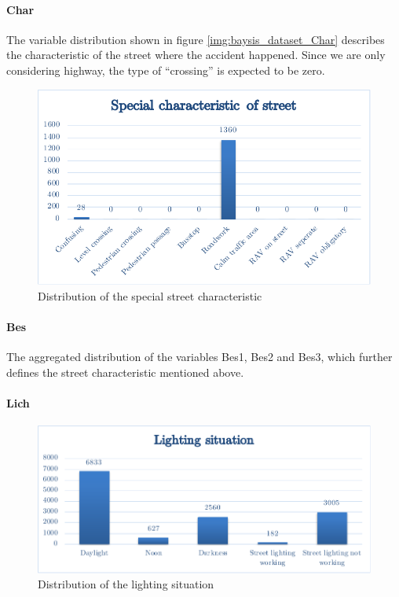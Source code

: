\documentclass[a4paper,12pt]{report}
\begin{document}
\paragraph{Char}
The variable distribution shown in figure \ref{img:baysis_dataset_Char} describes the characteristic of the street where the accident happened. Since we are only considering highway, the type of “crossing” is expected to be zero. 

\begin{figure}[h]
	\centering
	\includegraphics[scale=0.6]{./assets/baysis_dataset_Bes.pdf}
	\caption{Distribution of the special street characteristic}
	\label{img:baysis_dataset_Bes}
\end{figure}

\paragraph{Bes}
The aggregated distribution of the variables Bes1, Bes2 and Bes3, which further defines the street characteristic mentioned above. 

\paragraph{Lich}
\begin{figure}[h]
	\centering
	\includegraphics[scale=0.6]{./assets/baysis_dataset_Lich.pdf}
	\caption{Distribution of the lighting situation}
	\label{img:baysis_dataset_Lich}
\end{figure}
\end{document}
